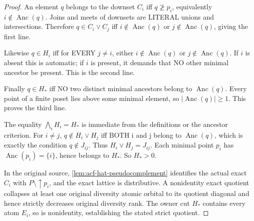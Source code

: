 \begin{proof}
An element $q$ belongs to
the downset $C_i$ iff
$q\not\ge p_i$, equivalently
$i\notin\operatorname{Anc}(q)$.
Joins and meets of downsets
are LITERAL unions and
intersections. Therefore
$q\in C_i\vee C_j$ iff
$i\notin\operatorname{Anc}(q)$
or $j\notin\operatorname{Anc}(q)$,
giving the first line.

Likewise
$q\in H_i$ iff for EVERY
$j\ne i$, either
$i\notin\operatorname{Anc}(q)$
or $j\notin\operatorname{Anc}(q)$.
If $i$ is absent this is
automatic; if $i$ is
present, it demands that
NO other minimal ancestor
be present. This is the
second line.

Finally $q\in H_*$ iff
NO two distinct minimal
ancestors belong to
$\operatorname{Anc}(q)$.
Every point of a finite
poset lies above some
minimal element, so
$|\operatorname{Anc}(q)|\ge1$.
This proves the third line.

The equality
$\bigwedge_iH_i=H_*$
is immediate from the
definitions or the ancestor
criterion. For $i\ne j$,
$q\notin H_i\vee H_j$
iff BOTH i and j belong
to $\operatorname{Anc}(q)$,
which is exactly the
condition $q\notin J_{ij}$.
Thus $H_i\vee H_j=J_{ij}$.
Each minimal point $p_i$
has $\operatorname{Anc}(p_i)=\{i\}$,
hence belongs to $H_*$.
So $H_*>0$.

In the original source,
\cref{lem:acf-hat-pseudocomplement}
identifies the actual exact
$\widehat C_i$ with
$P\setminus\uparrow p_i$,
and the exact lattice is
distributive. A nonidentity
exact quotient collapses at
least one original diversity
atomic orbital to its
quotient diagonal and hence
strictly decreases original
diversity rank. The owner
cut $H_*$ contains every
atom $E_i$, so is
nonidentity, establishing
the stated strict quotient.
\end{proof}

